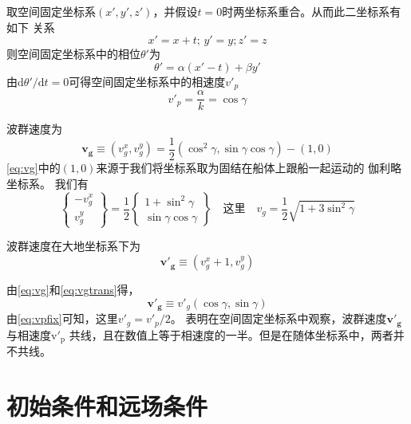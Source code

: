 取空间固定坐标系$(x',y',z')$，并假设$t=0$时两坐标系重合。从而此二坐标系有如下
关系
\begin{equation}
  x'=x+t;\,y'=y;z'=z
  \label{eq:xtrans}
\end{equation}
则空间固定坐标系中的相位$\theta'$为
\begin{equation}
  \theta'=\alpha(x'-t)+\beta y'
  \label{eq:thetafix}
\end{equation}
由$\mathrm{d}\theta'/\mathrm{d}t=0$可得空间固定坐标系中的相速度$v'_p$
\begin{equation}
  v'_p=\frac{\alpha}{k}=\cos\gamma
  \label{eq:vpfix}
\end{equation}

波群速度为
\begin{equation}
  \mathbf{v_g}\equiv(v_g^x,v_g^y)=\frac{1}{2}(\cos^2\gamma,\sin\gamma\cos\gamma)-(1,0)
  \label{eq:vg}
\end{equation}
\eqref{eq:vg}中的$(1,0)$来源于我们将坐标系取为固结在船体上跟船一起运动的
伽利略坐标系。
我们有
\begin{equation}
  \left\{
    \begin{array}{r}
      -v_g^x \\
      v_g^y
    \end{array}
  \right\}
  =\frac{1}{2}\left\{
    \begin{array}{l}
    1+\sin^2\gamma\\
    \sin\gamma\cos\gamma
  \end{array}
\right\}
\quad\text{这里}\quad v_g=\frac{1}{2}\sqrt{1+3\sin^2\gamma}
\label{eq:vg2}
\end{equation}


波群速度在大地坐标系下为
\begin{equation}
  \mathbf{v'_g}\equiv(v_g^x+1,v_g^y)
  \label{eq:vgtrans}
\end{equation}

由\eqref{eq:vg}和\eqref{eq:vgtrans}得，
\begin{equation}
  \mathbf{v'_g}\equiv v'_g(\cos\gamma,\sin\gamma)
  \label{eq:vgfixed}
\end{equation}
由\eqref{eq:vpfix}可知，这里$v'_g=v'_p/2$。
表明在空间固定坐标系中观察，波群速度$\mathbf{v'_g}$与相速度$\mathrm{v'_p}$
共线，且在数值上等于相速度的一半。但是在随体坐标系中，两者并不共线。






\section{初始条件和远场条件}
\label{sec:initfar}

